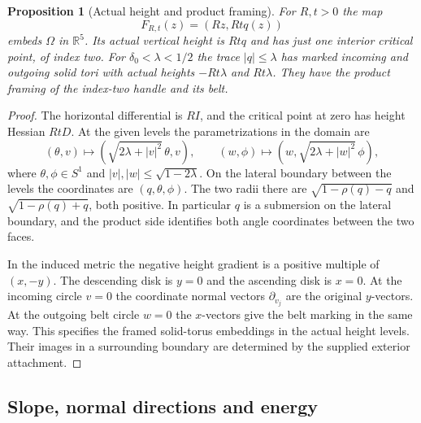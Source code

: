 \documentclass[11pt,letterpaper]{article}
\numberwithin{equation}{section}
\newtheorem{proposition}[theorem]{Proposition}
\theoremstyle{definition}
\begin{document}
\begin{proposition}[Actual height and product framing]\label{prop:trace}
For \(R,t>0\) the map
\[
                 F_{R,t}(z)=(Rz,Rtq(z))
\]
embeds \(\Omega\) in \(\mathbb R^5\). Its actual vertical height is
\(Rtq\) and has just one interior critical point, of index two.
For \(\delta_0<\lambda<1/2\) the trace \(|q|\le\lambda\)
has marked incoming and outgoing solid tori with actual heights
\(-Rt\lambda\) and \(Rt\lambda\). They have the product framing
of the index-two handle and its belt.
\end{proposition}

\begin{proof}
The horizontal differential is \(RI\), and the critical point at
zero has height Hessian \(RtD\). At the given levels the parametrizations
in the domain are
\[
 (\theta,v)\longmapsto(\sqrt{2\lambda+|v|^2}\,\theta,v),
 \qquad
 (w,\phi)\longmapsto(w,\sqrt{2\lambda+|w|^2}\,\phi),
\]
where \(\theta,\phi\in S^1\) and \(|v|,|w|\le\sqrt{1-2\lambda}\).
On the lateral boundary between the levels the coordinates are
\((q,\theta,\phi)\). The two radii there are
\(\sqrt{1-\rho(q)-q}\) and \(\sqrt{1-\rho(q)+q}\),
both positive. In particular \(q\) is a submersion on the lateral
boundary, and the product side identifies both angle coordinates
between the two faces.

In the induced metric the negative height gradient is a positive
multiple of \((x,-y)\). The descending disk is \(y=0\) and the
ascending disk is \(x=0\). At the incoming circle \(v=0\) the
coordinate normal vectors \(\partial_{v_j}\) are the original
\(y\)-vectors. At the outgoing belt circle \(w=0\) the \(x\)-vectors
give the belt marking in the same way. This specifies the
framed solid-torus embeddings in the actual height levels.
Their images in a surrounding boundary are determined by the
supplied exterior attachment.
\end{proof}

\subsection{Slope, normal directions and energy}
\end{document}
